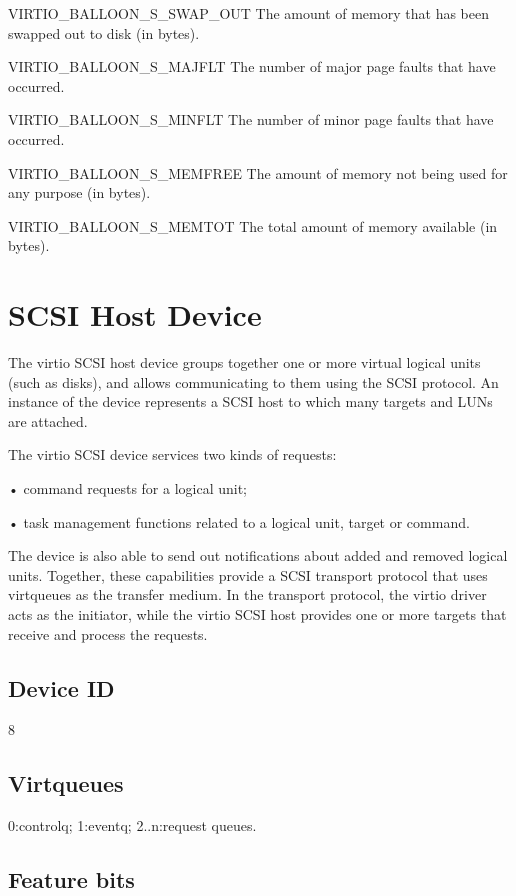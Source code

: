   VIRTIO_BALLOON_S_SWAP_OUT The amount of memory that has been
  swapped out to disk (in bytes).

  VIRTIO_BALLOON_S_MAJFLT The number of major page faults that
  have occurred.

  VIRTIO_BALLOON_S_MINFLT The number of minor page faults that
  have occurred.

  VIRTIO_BALLOON_S_MEMFREE The amount of memory not being used
  for any purpose (in bytes).

  VIRTIO_BALLOON_S_MEMTOT The total amount of memory available
  (in bytes).


\section{SCSI Host Device}\label{sec:Device Types / SCSI Host Device}

The virtio SCSI host device groups together one or more virtual
logical units (such as disks), and allows communicating to them
using the SCSI protocol. An instance of the device represents a
SCSI host to which many targets and LUNs are attached.

The virtio SCSI device services two kinds of requests:

• command requests for a logical unit;

• task management functions related to a logical unit, target or
  command.

The device is also able to send out notifications about added and
removed logical units. Together, these capabilities provide a
SCSI transport protocol that uses virtqueues as the transfer
medium. In the transport protocol, the virtio driver acts as the
initiator, while the virtio SCSI host provides one or more
targets that receive and process the requests.

\subsection{Device ID}\label{sec:Device Types / SCSI Host Device / Device ID}
  8

\subsection{Virtqueues}\label{sec:Device Types / SCSI Host Device / Virtqueues}
   0:controlq; 1:eventq; 2..n:request queues.

\subsection{Feature bits}\label{sec:Device Types / SCSI Host Device / Feature bits}

